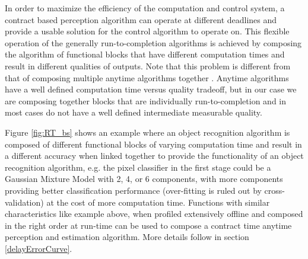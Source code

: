 In order to maximize the efficiency of the computation and control system, a contract based perception algorithm can operate at different deadlines and provide a usable solution for the control algorithm to operate on. This flexible operation of the generally run-to-completion algorithms is achieved by composing the algorithm of functional blocks that have different computation times and result in different qualities of outputs. Note that this problem is different from that of composing multiple anytime algorithms together \cite{zilbersteinAImag}. Anytime algorithms \cite{boddy} have a well defined computation time versus quality tradeoff, but in our case we are composing together blocks that are individually run-to-completion and in most cases do not have a well defined intermediate measurable quality.

Figure \ref{fig:RT_bs} shows an example where an object recognition algorithm is composed of different functional blocks of varying computation time and result in a different accuracy when linked together to provide the functionality of an object recognition algorithm, e.g. the pixel classifier in the first stage could be a Gaussian Mixture Model with 2, 4, or 6 components, with more components providing better classification performance (over-fitting is ruled out by cross-validation) at the cost of more computation time. Functions with similar characteristics like example above, when profiled extensively offline and composed in the right order at run-time can be used to compose a contract time anytime perception and estimation algorithm. More details follow in section \ref{delayErrorCurve}.







